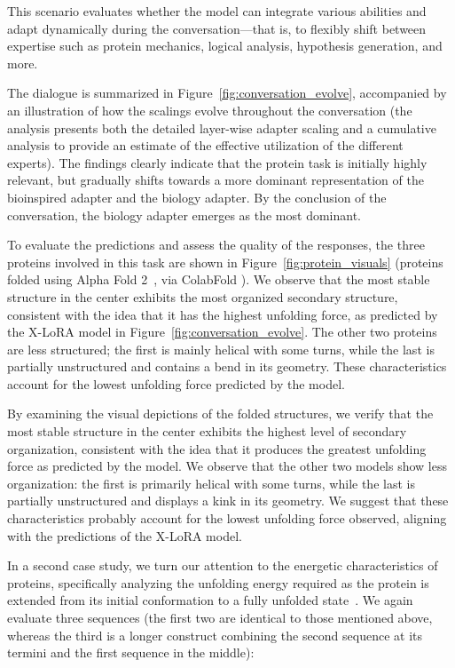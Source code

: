 This scenario evaluates whether the model can integrate various abilities and adapt dynamically during the conversation—that is, to flexibly shift between expertise such as protein mechanics, logical analysis, hypothesis generation, and more.

The dialogue is summarized in Figure~\ref{fig:conversation_evolve}, accompanied by an illustration of how the scalings evolve throughout the conversation (the analysis presents both the detailed layer-wise adapter scaling and a cumulative analysis to provide an estimate of the effective utilization of the different experts). The findings clearly indicate that the protein task is initially highly relevant, but gradually shifts towards a more dominant representation of the bioinspired adapter and the biology adapter. By the conclusion of the conversation, the biology adapter emerges as the most dominant.

To evaluate the predictions and assess the quality of the responses, the three proteins involved in this task are shown in Figure~\ref{fig:protein_visuals} (proteins folded using Alpha Fold 2~\cite{Jumper2021HighlyAlphaFoldb}, via ColabFold \cite{Mirdita2022ColabFold:All}). We observe that the most stable structure in the center exhibits the most organized secondary structure, consistent with the idea that it has the highest unfolding force, as predicted by the X-LoRA model in Figure~\ref{fig:conversation_evolve}. The other two proteins are less structured; the first is mainly helical with some turns, while the last is partially unstructured and contains a bend in its geometry. These characteristics account for the lowest unfolding force predicted by the model.

By examining the visual depictions of the folded structures, we verify that the most stable structure in the center exhibits the highest level of secondary organization, consistent with the idea that it produces the greatest unfolding force as predicted by the model. We observe that the other two models show less organization: the first is primarily helical with some turns, while the last is partially unstructured and displays a kink in its geometry. We suggest that these characteristics probably account for the lowest unfolding force observed, aligning with the predictions of the X-LoRA model.

In a second case study, we turn our attention to the energetic characteristics of proteins, specifically analyzing the unfolding energy required as the protein is extended from its initial conformation to a fully unfolded state~\cite{Ni2023ForceGen:Model}. We again evaluate three sequences (the first two are identical to those mentioned above, whereas the third is a longer construct combining the second sequence at its termini and the first sequence in the middle):


